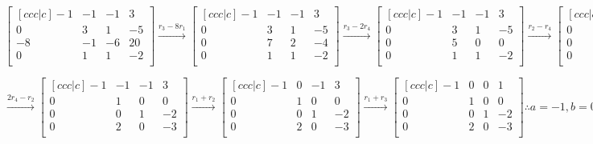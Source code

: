 \documentclass[12pt]{article}
\begin{document}
$$
\begin{bmatrix}[ccc|c]
   -1 & -1 & -1 & 3 \\
   0 & 3 & 1 & -5 \\
   -8 & -1 & -6 & 20 \\
   0 & 1 & 1 & -2 \\
\end{bmatrix} \overset{r_3-8r_1}{\longrightarrow}
\begin{bmatrix}[ccc|c]
   -1 & -1 & -1 & 3 \\
   0 & 3 & 1 & -5 \\
   0 & 7 & 2 & -4 \\
   0 & 1 & 1 & -2 \\
\end{bmatrix} \overset{r_3-2r_4}{\longrightarrow}
\begin{bmatrix}[ccc|c]
   -1 & -1 & -1 & 3 \\
   0 & 3 & 1 & -5 \\
   0 & 5 & 0 & 0 \\
   0 & 1 & 1 & -2 \\
\end{bmatrix} \overset{r_2-r_4}{\longrightarrow}
\begin{bmatrix}[ccc|c]
   -1 & -1 & -1 & 3 \\
   0 & 2 & 0 & -3 \\
   0 & 5 & 0 & 0 \\
   0 & 1 & 1 & -2 \\
\end{bmatrix}
$$

$$
 \overset{2r_4-r_2}{\longrightarrow}
\begin{bmatrix}[ccc|c]
   -1 & -1 & -1 & 3 \\
   0 & 1 & 0 & 0 \\
   0 & 0 & 1 & -2 \\
   0 & 2 & 0 & -3 \\
\end{bmatrix} \overset{r_1+r_2}{\longrightarrow}
\begin{bmatrix}[ccc|c]
   -1 & 0 & -1 & 3 \\
   0 & 1 & 0 & 0 \\
   0 & 0 & 1 & -2 \\
   0 & 2 & 0 & -3 \\
\end{bmatrix} \overset{r_1+r_3}{\longrightarrow}
\begin{bmatrix}[ccc|c]
   -1 & 0 & 0 & 1 \\
   0 & 1 & 0 & 0 \\
   0 & 0 & 1 & -2 \\
   0 & 2 & 0 & -3 \\
\end{bmatrix}
\therefore
a=-1, b=0, c=-2
$$
\end{document}
